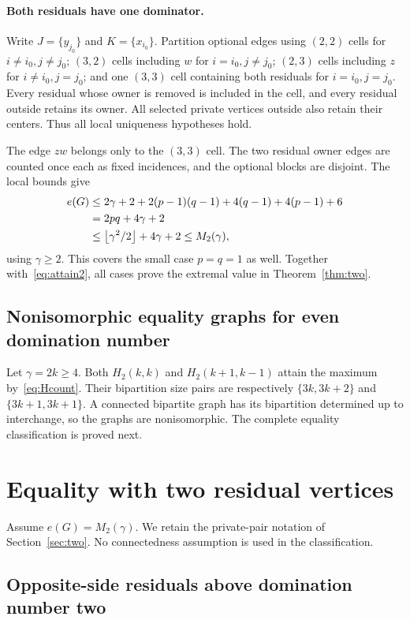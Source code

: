 \documentclass[11pt]{article}
\theoremstyle{definition}
\theoremstyle{remark}
\newcommand{\e}{e}
\newcommand{\floor}[1]{\left\lfloor#1\right\rfloor}
\begin{document}
\paragraph{Both residuals have one dominator.}
Write $J=\{y_{j_0}\}$ and $K=\{x_{i_0}\}$. Partition optional edges using
$(2,2)$ cells for $i\ne i_0,j\ne j_0$; $(3,2)$ cells including $w$ for
$i=i_0,j\ne j_0$; $(2,3)$ cells including $z$ for $i\ne i_0,j=j_0$;
and one $(3,3)$ cell containing both residuals for $i=i_0,j=j_0$.
Every residual whose owner is removed is included in the cell, and every
residual outside retains its owner. All selected private vertices outside
also retain their centers. Thus all local uniqueness hypotheses hold.

The edge $zw$ belongs only to the $(3,3)$ cell. The two residual owner
edges are counted once each as fixed incidences, and the optional blocks
are disjoint. The local bounds give
\begin{align}
 \e(G)&\le2\gamma+2+2(p-1)(q-1)+4(q-1)+4(p-1)+6\notag\\
       &=2pq+4\gamma+2\notag\\
       &\le\floor{\gamma^2/2}+4\gamma+2\le M_2(\gamma),\label{eq:two-single}
\end{align}
using $\gamma\ge2$. This covers the small case $p=q=1$ as well.
Together with~\eqref{eq:attain2}, all cases prove the extremal value in
Theorem~\ref{thm:two}.

\subsection{Nonisomorphic equality graphs for even domination number}

Let $\gamma=2k\ge4$. Both $H_2(k,k)$ and $H_2(k+1,k-1)$ attain the
maximum by~\eqref{eq:Hcount}. Their bipartition size pairs are respectively
$\{3k,3k+2\}$ and $\{3k+1,3k+1\}$. A connected bipartite graph has its
bipartition determined up to interchange, so the graphs are nonisomorphic.
The complete equality classification is proved next.

\section{Equality with two residual vertices}\label{sec:two-rigidity}

Assume $\e(G)=M_2(\gamma)$. We retain the private-pair notation of
Section~\ref{sec:two}. No connectedness assumption is used in the classification.

\subsection{Opposite-side residuals above domination number two}
\end{document}
